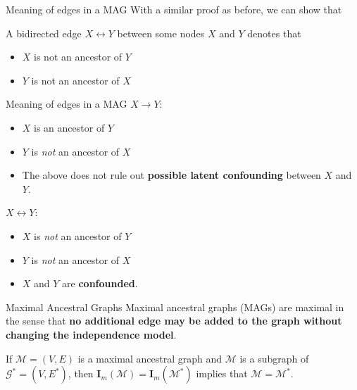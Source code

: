 \documentclass[english, compress, red]{beamer}
\begin{document}
\begin{frame}{Meaning of edges in a MAG}
	With a similar proof as before, we can show that 
	
	\begin{theorem}A bidirected edge $X \leftrightarrow Y$ between some nodes $X$ and $Y$ denotes that 
		\begin{itemize}
			\item $X$ is not an ancestor of $Y$
			\item $Y$ is not an ancestor of $X$
		\end{itemize}
	\end{theorem}
\end{frame}

\begin{frame}{Meaning of edges in a MAG}
	$X \rightarrow Y$:
	\begin{itemize}
		\item $X$ is an ancestor of $Y$
		\item $Y$ is \textit{not} an ancestor of $X$
		\item The above does not rule out \textbf{possible latent confounding} between $X$ and $Y$.
	\end{itemize}
	$X \leftrightarrow Y$:
	\begin{itemize}
		\item $X$ is \textit{not} an ancestor of $Y$
		\item $Y$ is \textit{not} an ancestor of $X$
		\item $X$ and $Y$ are \textbf{confounded}.
	\end{itemize}
\end{frame}

\begin{frame}{Maximal Ancestral Graphs}
	Maximal ancestral graphs (MAGs) are maximal in the sense that \textbf{no additional edge may be added to the graph without changing the independence model}.
	
	\begin{theorem}If $\mathcal{M} = (V,E)$ is a maximal ancestral graph and $\mathcal{M}$ is a subgraph of $\mathcal{G}^* = (V,E^*)$, then $\mathbf{I}_m (\mathcal{M}) = \mathbf{I}_m(\mathcal{M}^*)$ implies that $\mathcal{M} = \mathcal{M}^*$.
	\end{theorem}
\end{frame}
\end{document}
